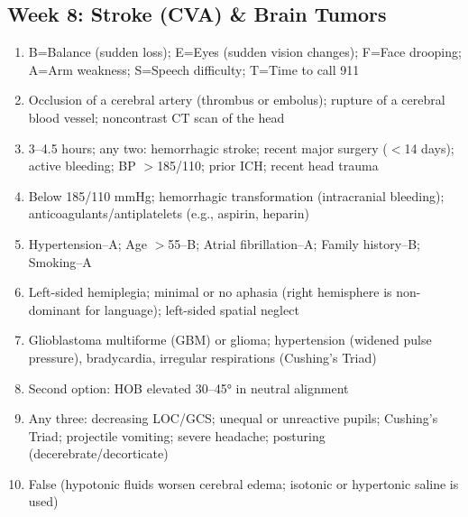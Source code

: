 \documentclass[11pt,letterpaper]{article}
\begin{document}
\begin{keybox}
\subsection*{Week 8: Stroke (CVA) \& Brain Tumors}
\begin{enumerate}[leftmargin=1.5em,label=\textbf{\arabic*.},start=71]
  \item B=Balance (sudden loss); E=Eyes (sudden vision changes); F=Face drooping; A=Arm weakness; S=Speech difficulty; T=Time to call 911
  \item Occlusion of a cerebral artery (thrombus or embolus); rupture of a cerebral blood vessel; noncontrast CT scan of the head
  \item 3--4.5 hours; any two: hemorrhagic stroke; recent major surgery ($<$14 days); active bleeding; BP $>$185/110; prior ICH; recent head trauma
  \item Below 185/110 mmHg; hemorrhagic transformation (intracranial bleeding); anticoagulants/antiplatelets (e.g., aspirin, heparin)
  \item Hypertension--A; Age $>$55--B; Atrial fibrillation--A; Family history--B; Smoking--A
  \item Left-sided hemiplegia; minimal or no aphasia (right hemisphere is non-dominant for language); left-sided spatial neglect
  \item Glioblastoma multiforme (GBM) or glioma; hypertension (widened pulse pressure), bradycardia, irregular respirations (Cushing's Triad)
  \item Second option: HOB elevated 30--45° in neutral alignment
  \item Any three: decreasing LOC/GCS; unequal or unreactive pupils; Cushing's Triad; projectile vomiting; severe headache; posturing (decerebrate/decorticate)
  \item False (hypotonic fluids worsen cerebral edema; isotonic or hypertonic saline is used)
\end{enumerate}

\hrulefill

\end{keybox}
\end{document}
